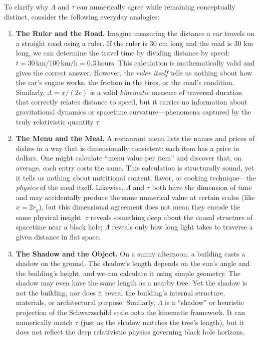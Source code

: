 \documentclass[12pt,a4paper]{article}
\begin{document}
To clarify why $\Lambda$ and $\tau$ can numerically agree while remaining conceptually distinct, consider the following everyday analogies:

\begin{enumerate}
    \item \textbf{The Ruler and the Road.} 
    Imagine measuring the distance a car travels on a straight road using a ruler. If the ruler is 30 cm long and the road is 30 km long, we can determine the travel time by dividing distance by speed: $t = 30\,\text{km} / 100\,\text{km/h} = 0.3\,\text{hours}$. This calculation is mathematically valid and gives the correct answer. However, the \emph{ruler itself} tells us nothing about how the car's engine works, the friction in the tires, or the road's condition. Similarly, $\Lambda = x/(2c)$ is a valid \emph{kinematic} measure of traversal duration that correctly relates distance to speed, but it carries no information about gravitational dynamics or spacetime curvature—phenomena captured by the truly relativistic quantity $\tau$.

    \item \textbf{The Menu and the Meal.} 
    A restaurant menu lists the names and prices of dishes in a way that is dimensionally consistent: each item has a price in dollars. One might calculate ``menu value per item'' and discover that, on average, each entry costs the same. This calculation is structurally sound, yet it tells us nothing about nutritional content, flavor, or cooking technique—the \emph{physics} of the meal itself. Likewise, $\Lambda$ and $\tau$ both have the dimension of time and may accidentally produce the same numerical value at certain scales (like $x = 2r_g$), but this dimensional agreement does not mean they encode the same physical insight. $\tau$ reveals something deep about the causal structure of spacetime near a black hole; $\Lambda$ reveals only how long light takes to traverse a given distance in flat space.

    \item \textbf{The Shadow and the Object.} 
    On a sunny afternoon, a building casts a shadow on the ground. The shadow's length depends on the sun's angle and the building's height, and we can calculate it using simple geometry. The shadow may even have the same length as a nearby tree. Yet the shadow is not the building, nor does it reveal the building's internal structure, materials, or architectural purpose. Similarly, $\Lambda$ is a ``shadow'' or heuristic projection of the Schwarzschild scale onto the kinematic framework. It can numerically match $\tau$ (just as the shadow matches the tree's length), but it does not reflect the deep relativistic physics governing black hole horizons.
\end{enumerate}
\end{document}

